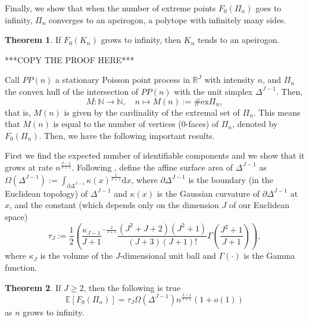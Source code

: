 \documentclass[12pt, reqno]{amsart}
\theoremstyle{definition}
\newtheorem{theorem}{Theorem}%
\begin{document}
Finally, we show that when the number of extreme points $F_0(\Pi_n)$ goes to infinity, $\Pi_n$ converges to an apeirogon, a polytope with infinitely many sides.

\begin{theorem}\label{hullconv2}
If $F_0(K_n)$ grows to infinity, then $K_n$ tends to an apeirogon.
\end{theorem}


***COPY THE PROOF HERE***













\iffalse
Call $PP(n)$ a stationary Poisson point process in $\mathbb{R}^J$ with intensity $n$, and $\Pi_n$ the convex hull of the intersection of $PP(n)$ with the unit simplex $\Delta^{J-1}$. Then,
$$M:\mathbb{N}\rightarrow\mathbb{N}, \quad n \mapsto M(n):=\#\text{ex}\Pi_n,$$
that is, $M(n)$ is given by the cardinality of the extremal set of $\Pi_n$. This means that $M(n)$ is equal to the number of vertices ($0$-faces) of $\Pi_n$, denoted by $F_0(\Pi_n)$. Then, we have the following important results.

First we find the expected number of identifiable components and we show that it grows at rate $n^{\frac{J-1}{J+1}}$. Following \cite[page 2137]{reitzner_aop}, define the affine
surface area of $\Delta^{J-1}$ as $\Omega(\Delta^{J-1}):=\int_{\partial \Delta^{J-1}} \kappa(x)^{\frac{1}{J+1}}\text{d}x$, where $\partial \Delta^{J-1}$ is the boundary (in the Euclidean topology) of $\Delta^{J-1}$ and $\kappa(x)$ is the Gaussian curvature of $\partial \Delta^{J-1}$ at $x$, and the constant (which depends only on the dimension $J$ of our Euclidean space)
$$\tau_J:=\frac{1}{2}\left( \frac{\kappa_{J-1}}{J+1}^{-\frac{2}{J+1}} \frac{(J^2+J+2)(J^2+1)}{(J+3)(J+1)!} \Gamma\left( \frac{J^2+1}{J+1} \right) \right),$$
where $\kappa_{J}$ is the volume of the $J$-dimensional unit ball and $\Gamma(\cdot)$ is the Gamma function.

\begin{theorem}\label{exp_pois}
If $J\geq 2$, then the following is true
\begin{equation}\label{exp_pois_eq}
    \mathbb{E}[F_0(\Pi_n)] = \tau_J \Omega(\Delta^{J-1})n^{\frac{J-1}{J+1}}\left(1+o(1)\right)
\end{equation}
as $n$ grows to infinity.
\end{theorem}
\end{document}
